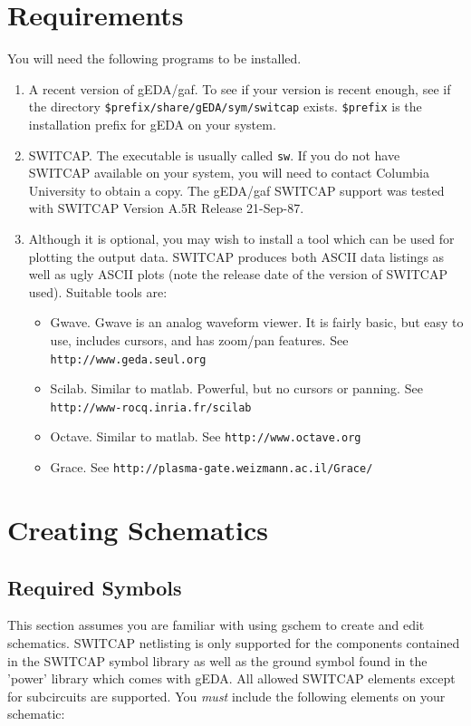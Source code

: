 \documentclass{article}
\begin{document}
\section{Requirements}
You will need the following programs to be installed.
\begin{enumerate}
\item A recent version of gEDA/gaf.  To see if your version is recent
  enough, see if the directory {\tt \${prefix}/share/gEDA/sym/switcap}
  exists.  {\tt \${prefix}} is the installation prefix for gEDA on
  your system.

\item SWITCAP.  The executable is usually called {\tt sw}.  If you do
  not have SWITCAP available on your system, you will need to contact
  Columbia University to obtain a copy.  The gEDA/gaf SWITCAP support
  was tested with SWITCAP Version A.5R Release 21-Sep-87.

\item Although it is optional, you may wish to install a tool which
  can be used for plotting the output data.  SWITCAP produces both
  ASCII data listings as well as ugly ASCII plots (note the release
  date of the version of SWITCAP used).  Suitable tools are:
  \begin{itemize}
    \item Gwave.  Gwave is an analog waveform viewer.  It is fairly
      basic, but easy to use, includes cursors, and has zoom/pan
      features.  See {\tt http://www.geda.seul.org} 
    \item Scilab.  Similar to matlab.  Powerful, but no cursors or
      panning.  See {\tt http://www-rocq.inria.fr/scilab}
    \item Octave.  Similar to matlab.  See {\tt http://www.octave.org}
    \item Grace.  See {\tt http://plasma-gate.weizmann.ac.il/Grace/}
    \end{itemize}
\end{enumerate}

\section{Creating Schematics}
\subsection{Required Symbols}
This section assumes you are familiar with using gschem to create and
edit schematics.  SWITCAP netlisting is only supported for the
components contained in the SWITCAP symbol library as well as the
ground symbol found in the 'power' library which comes with gEDA.  All
allowed SWITCAP elements except for subcircuits are supported.  You
{\em must} include the following elements on your schematic:
\end{document}
